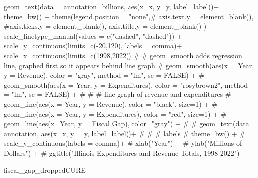 \documentclass[
  letterpaper,
  DIV=11,
  numbers=noendperiod]{scrreport}
\newenvironment{Shaded}{\begin{snugshade}}{\end{snugshade}}
\newcommand{\AttributeTok}[1]{\textcolor[rgb]{0.40,0.45,0.13}{#1}}
\newcommand{\CommentTok}[1]{\textcolor[rgb]{0.37,0.37,0.37}{#1}}
\newcommand{\DecValTok}[1]{\textcolor[rgb]{0.68,0.00,0.00}{#1}}
\newcommand{\FunctionTok}[1]{\textcolor[rgb]{0.28,0.35,0.67}{#1}}
\newcommand{\NormalTok}[1]{\textcolor[rgb]{0.00,0.23,0.31}{#1}}
\newcommand{\SpecialCharTok}[1]{\textcolor[rgb]{0.37,0.37,0.37}{#1}}
\newcommand{\StringTok}[1]{\textcolor[rgb]{0.13,0.47,0.30}{#1}}
\begin{document}
\begin{Shaded}
\begin{Highlighting}[]
  \FunctionTok{geom\_text}\NormalTok{(}\AttributeTok{data =}\NormalTok{ annotation\_billions, }\FunctionTok{aes}\NormalTok{(}\AttributeTok{x=}\NormalTok{x, }\AttributeTok{y=}\NormalTok{y, }\AttributeTok{label=}\NormalTok{label))}\SpecialCharTok{+}
    \FunctionTok{theme\_bw}\NormalTok{() }\SpecialCharTok{+}
  \FunctionTok{theme}\NormalTok{(}\AttributeTok{legend.position =} \StringTok{"none"}\NormalTok{,}\CommentTok{\# axis.text.y = element\_blank(),}
                                    \CommentTok{\#axis.ticks.y = element\_blank(),}
                                    \AttributeTok{axis.title.y =} \FunctionTok{element\_blank}\NormalTok{() )}\SpecialCharTok{+}
    \FunctionTok{scale\_linetype\_manual}\NormalTok{(}\AttributeTok{values =} \FunctionTok{c}\NormalTok{(}\StringTok{"dashed"}\NormalTok{, }\StringTok{"dashed"}\NormalTok{)) }\SpecialCharTok{+}
  \FunctionTok{scale\_y\_continuous}\NormalTok{(}\AttributeTok{limits=}\FunctionTok{c}\NormalTok{(}\SpecialCharTok{{-}}\DecValTok{20}\NormalTok{,}\DecValTok{120}\NormalTok{), }\AttributeTok{labels =}\NormalTok{ comma)}\SpecialCharTok{+}
    \FunctionTok{scale\_x\_continuous}\NormalTok{(}\AttributeTok{limits=}\FunctionTok{c}\NormalTok{(}\DecValTok{1998}\NormalTok{,}\DecValTok{2022}\NormalTok{))}
  \CommentTok{\# \# geom\_smooth adds regression line, graphed first so it appears behind line graph}
  \CommentTok{\# geom\_smooth(aes(x = Year, y = Revenue), color = "gray", method = "lm", se = FALSE) + }
  \CommentTok{\# geom\_smooth(aes(x = Year, y = Expenditures), color = "rosybrown2", method = "lm", se = FALSE) +}
  \CommentTok{\# }
  \CommentTok{\# \# line graph of revenue and expenditures}
  \CommentTok{\# geom\_line(aes(x = Year, y = Revenue), color = "black", size=1) +}
  \CommentTok{\# geom\_line(aes(x = Year, y = Expenditures), color = "red", size=1) +}
  \CommentTok{\# geom\_line(aes(x=Year, y = \textasciigrave{}Fiscal Gap\textasciigrave{}), color="gray") +}
  \CommentTok{\# }
  \CommentTok{\# geom\_text(data= annotation, aes(x=x, y = y, label=label))+}
  \CommentTok{\# }
  \CommentTok{\# \# labels}
  \CommentTok{\#   theme\_bw() +}
  \CommentTok{\# scale\_y\_continuous(labels = comma)+}
  \CommentTok{\# xlab("Year") + }
  \CommentTok{\# ylab("Millions of Dollars")  +}
  \CommentTok{\# ggtitle("Illinois Expenditures and Revenue Totals, 1998{-}2022")}

\NormalTok{fiscal\_gap\_droppedCURE}
\end{Highlighting}
\end{Shaded}
\end{document}

